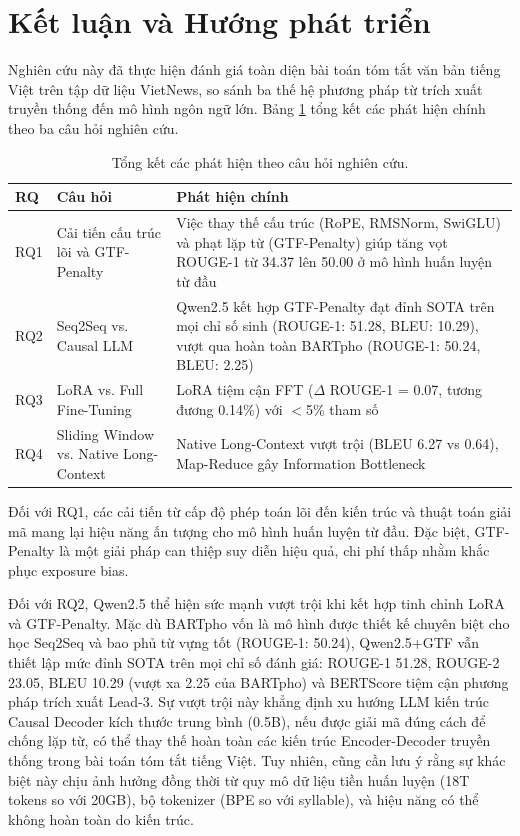 \documentclass{article}
\begin{document}
\section{Kết luận và Hướng phát triển}
\label{sec:conclusion}

Nghiên cứu này đã thực hiện đánh giá toàn diện bài toán tóm tắt văn bản tiếng Việt trên tập dữ liệu VietNews, so sánh ba thế hệ phương pháp từ trích xuất truyền thống đến mô hình ngôn ngữ lớn. Bảng \ref{tab:rq_summary} tổng kết các phát hiện chính theo ba câu hỏi nghiên cứu.

\begin{table}[H]
\centering
\caption{Tổng kết các phát hiện theo câu hỏi nghiên cứu.}
\label{tab:rq_summary}
\begin{tabular}{@{}p{1.5cm}p{4cm}p{8cm}@{}}
\toprule
\textbf{RQ} & \textbf{Câu hỏi} & \textbf{Phát hiện chính} \\
\midrule
RQ1 & Cải tiến cấu trúc lõi và GTF-Penalty & Việc thay thế cấu trúc (RoPE, RMSNorm, SwiGLU) và phạt lặp từ (GTF-Penalty) giúp tăng vọt ROUGE-1 từ 34.37 lên 50.00 ở mô hình huấn luyện từ đầu \\
RQ2 & Seq2Seq vs. Causal LLM & Qwen2.5 kết hợp GTF-Penalty đạt đỉnh SOTA trên mọi chỉ số sinh (ROUGE-1: 51.28, BLEU: 10.29), vượt qua hoàn toàn BARTpho (ROUGE-1: 50.24, BLEU: 2.25) \\
RQ3 & LoRA vs. Full Fine-Tuning & LoRA tiệm cận FFT ($\Delta$ ROUGE-1 = 0.07, tương đương 0.14\%) với $<$5\% tham số \\
RQ4 & Sliding Window vs. Native Long-Context & Native Long-Context vượt trội (BLEU 6.27 vs 0.64), Map-Reduce gây Information Bottleneck \\
\bottomrule
\end{tabular}
\end{table}

Đối với RQ1, các cải tiến từ cấp độ phép toán lõi đến kiến trúc và thuật toán giải mã mang lại hiệu năng ấn tượng cho mô hình huấn luyện từ đầu. Đặc biệt, GTF-Penalty là một giải pháp can thiệp suy diễn hiệu quả, chi phí thấp nhằm khắc phục exposure bias.

Đối với RQ2, Qwen2.5 thể hiện sức mạnh vượt trội khi kết hợp tinh chỉnh LoRA và GTF-Penalty. Mặc dù BARTpho vốn là mô hình được thiết kế chuyên biệt cho học Seq2Seq và bao phủ từ vựng tốt (ROUGE-1: 50.24), Qwen2.5+GTF vẫn thiết lập mức đỉnh SOTA trên mọi chỉ số đánh giá: ROUGE-1 51.28, ROUGE-2 23.05, BLEU 10.29 (vượt xa 2.25 của BARTpho) và BERTScore tiệm cận phương pháp trích xuất Lead-3. Sự vượt trội này khẳng định xu hướng LLM kiến trúc Causal Decoder kích thước trung bình (0.5B), nếu được giải mã đúng cách để chống lặp từ, có thể thay thế hoàn toàn các kiến trúc Encoder-Decoder truyền thống trong bài toán tóm tắt tiếng Việt. Tuy nhiên, cũng cần lưu ý rằng sự khác biệt này chịu ảnh hưởng đồng thời từ quy mô dữ liệu tiền huấn luyện (18T tokens so với 20GB), bộ tokenizer (BPE so với syllable), và hiệu năng có thể không hoàn toàn do kiến trúc.
\end{document}

